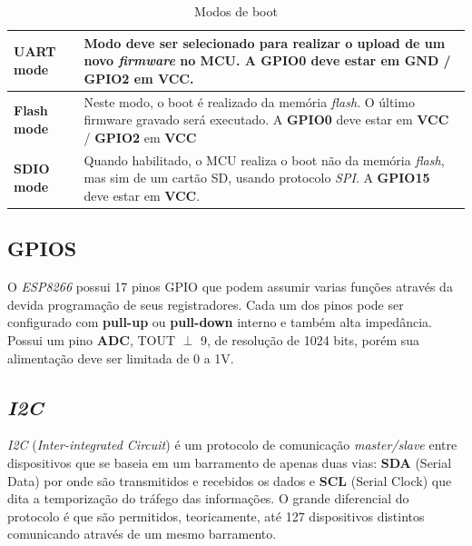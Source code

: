 \documentclass[
12pt,				%
openany,			%
twoside,			%
a4paper,			%
english,			%
french,				%
spanish,			%
brazil,				%
]{abntex2}
\begin{document}
\begin{table}[!ht]
    \centering
    \footnotesize{
        \label{Modos-Energia}
        \caption{Modos de boot}
        \begin{tabular}{>{\bfseries}lp{5.35cm}}
            \toprule
            UART mode & Modo deve ser selecionado para realizar o upload de um novo \textit{firmware} no MCU. A \textbf{\textsf{GPIO0}} deve estar em \textbf{\textsf{GND} / \textbf{\textsf{GPIO2}} em \textbf{\textsf{VCC}}}. \\\midrule
            Flash mode & Neste modo, o boot é realizado da memória \textit{flash}. O último firmware gravado será executado. A \textbf{\textsf{GPIO0}} deve estar em \textbf{\textsf{VCC}} / \textbf{\textsf{GPIO2}} em \textbf{\textsf{VCC}} \\\midrule
            SDIO mode & Quando habilitado, o MCU realiza o boot não da memória \textit{flash}, mas sim de um cartão SD, usando protocolo \textit{SPI}. A \textbf{\textsf{GPIO15}} deve estar em \textbf{\textsf{VCC}}. \\\bottomrule
        \end{tabular}
    }
\end{table}

\subsection{GPIOS}

O \textit{ESP8266} possui 17 pinos GPIO que podem assumir varias funções através da devida programação de seus registradores. Cada um dos pinos pode ser configurado com \textbf{\textsf{pull-up}} ou \textbf{\textsf{pull-down}} interno e também alta impedância. Possui um pino \textbf{\textsf{ADC}}, TOUT $\perp$ 9, de resolução de 1024 bits, porém sua alimentação deve ser limitada de 0 a 1V.

\subsection{\textit{I2C}}
\textit{I2C} (\textit{Inter-integrated Circuit}) é um protocolo de comunicação \textit{master/slave} entre dispositivos que se baseia em um barramento de apenas duas vias: \textbf{\textsf{SDA}} (Serial Data) por onde são transmitidos e recebidos os dados e \textbf{\textsf{SCL}} (Serial Clock) que dita a temporização do tráfego das informações. O grande diferencial do protocolo é que são permitidos, teoricamente, até 127 dispositivos distintos comunicando através de um mesmo barramento.
\end{document}
